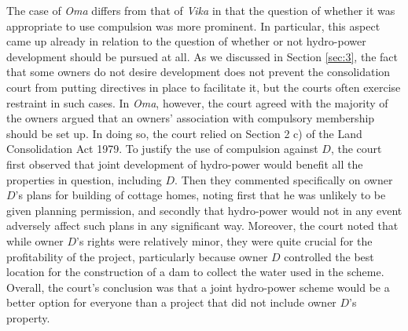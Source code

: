 The case of \emph{Oma} differs from that of \emph{Vika} in that the question of whether it was appropriate to use compulsion was more prominent. In particular, this aspect came up already in relation to the question of whether or not hydro-power development should be pursued at all. As we discussed in Section \ref{sec:3}, the fact that some owners do not desire development does not prevent the consolidation court from putting directives in place to facilitate it, but the courts often exercise restraint in such cases. In \emph{Oma}, however, the court agreed with the majority of the owners argued that an owners' association with compulsory membership should be set up. In doing so, the court relied on Section 2 c) of the Land Consolidation Act 1979. To justify the use of compulsion against $D$, the court first observed that joint development of hydro-power would benefit all the properties in question, including $D$. Then they commented specifically on owner $D$'s plans for building of cottage homes, noting first that he was unlikely to be given planning permission, and secondly that hydro-power would not in any event adversely affect such plans in any significant way. Moreover, the court noted that while owner $D$'s rights were relatively minor, they were quite crucial for the profitability of the project, particularly because owner $D$ controlled the best location for the construction of a dam to collect the water used in the scheme. Overall, the court's conclusion was that a joint hydro-power scheme would be a better option for everyone than a project that did not include owner $D$'s property.

